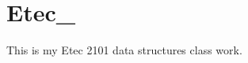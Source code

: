\chapter{Etec\+\_}
\hypertarget{index}{}\label{index}
\label{index_md__r_e_a_d_m_e}%
%


This is my Etec 2101 data structures class work. 